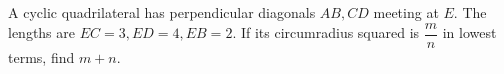 A cyclic quadrilateral has perpendicular diagonals $AB,CD$ meeting at $E$. The lengths are $EC=3,ED=4,EB=2$. If its circumradius squared is $\dfrac{m}{n}$ in lowest terms, find $m+n$.
